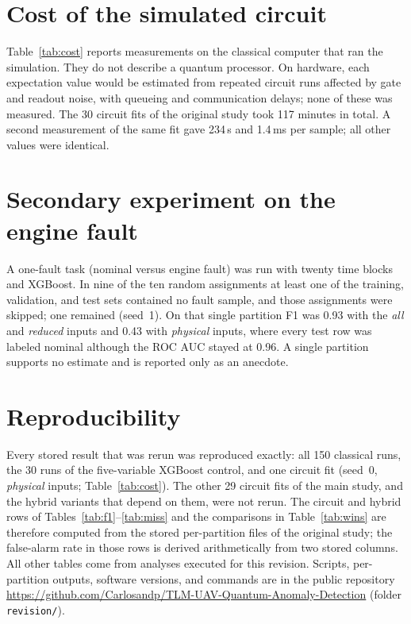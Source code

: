 \documentclass[10pt,a4paper]{article}
\newcommand{\T}[1]{}
\begin{document}
\clearpage
\section{Cost of the simulated circuit}
Table~\ref{tab:cost} reports measurements on the classical computer that
ran the simulation. They do not describe a quantum processor. On hardware,
each expectation value would be estimated from repeated circuit runs
affected by gate and readout noise, with queueing and communication delays;
none of these was measured. The 30 circuit fits of the original study took
117 minutes in total. A second measurement of the same fit gave 234\,s and
1.4\,ms per sample; all other values were identical.

\begin{table}[h]\centering\small
\caption{Measured cost of one circuit fit and of inference in simulation.}\label{tab:cost}
\T{S7_cost}
\end{table}

\section{Secondary experiment on the engine fault}
A one-fault task (nominal versus engine fault) was run with twenty time
blocks and XGBoost. In nine of the ten random assignments at least one of
the training, validation, and test sets contained no fault sample, and
those assignments were skipped; one remained (seed~1). On that single
partition F1 was 0.93 with the \emph{all} and \emph{reduced} inputs and 0.43
with \emph{physical} inputs, where every test row was labeled nominal
although the ROC AUC stayed at 0.96. A single partition supports no
estimate and is reported only as an anecdote.

\section{Reproducibility}
Every stored result that was rerun was reproduced exactly: all 150
classical runs, the 30 runs of the five-variable XGBoost control, and one
circuit fit (seed~0, \emph{physical} inputs; Table~\ref{tab:cost}). The other
29 circuit fits of the main study, and the hybrid variants that depend on
them, were not rerun. The circuit and hybrid rows of
Tables~\ref{tab:f1}--\ref{tab:miss} and the comparisons in
Table~\ref{tab:wins} are therefore computed from the stored per-partition
files of the original study; the false-alarm rate in those rows is derived
arithmetically from two stored columns. All other tables come from analyses
executed for this revision. Scripts, per-partition outputs, software versions,
and commands are in the public repository
\url{https://github.com/Carlosandp/TLM-UAV-Quantum-Anomaly-Detection}
(folder \texttt{revision/}).
\end{document}
